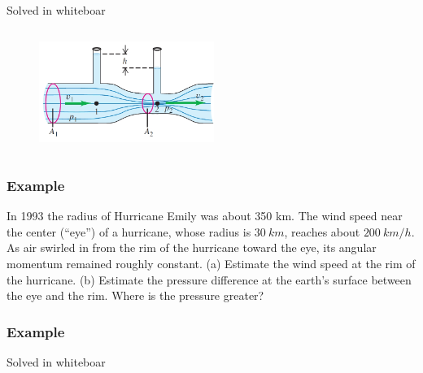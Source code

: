\documentclass[]{beamer}
\begin{document}


  \begin{frame}
\textcolor{mypink1}{Solved in whiteboar}


    \begin{columns}[c]
      \column{2in}  %
   
      \begin{figure}[h!]
        \begin{center}
          \includegraphics[height=1.3in]{images2/venturi2.jpg}
        \end{center}
      \end{figure}
  
      \column{2in}
   
   
      \end{columns}
   

    \end{frame}

  

\begin{frame}
  \frametitle{Example \theexamplef }
  In 1993 the radius of Hurricane Emily was about
  350 km.
The wind speed near the center (“eye”) of a hurricane,
  whose radius is  $30~km$, reaches about $200~km/h$. As air
  swirled in from the rim of the hurricane toward the eye, its angular
  momentum remained roughly constant. (a) Estimate the wind
speed at the rim of the hurricane. (b) Estimate the pressure difference
at the earth’s surface between the eye and the rim.  
Where is the pressure greater? 

  \end{frame}
  

\begin{frame}
  \frametitle{Example \theexamplef }
  \textcolor{mypink1}{Solved in whiteboar}

  \end{frame}
\end{document}
